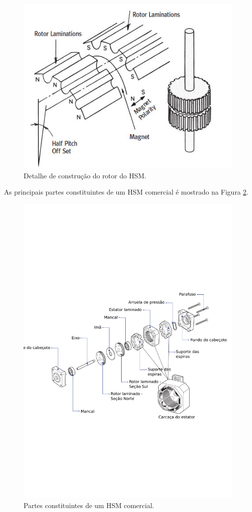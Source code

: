 \begin{figure}[!h]
	\centering
	\includegraphics[width = \columnwidth]{Images/VR_ROTOR.jpg}
	\caption{Detalhe de construção do rotor do HSM. \cite{angulo_rotor}}
	\label{fig:HSM_dentes}
\end{figure}

As principais partes constituintes de um HSM comercial é mostrado na Figura \ref{fig:partes_SM}.

\begin{figure}[!h]
	\centering
	\includegraphics[width = \columnwidth]{Images/partes_HSM.pdf}
	\caption{Partes constituintes de um HSM comercial. \cite{MoonsHSM}}
	\label{fig:partes_SM}
\end{figure}
